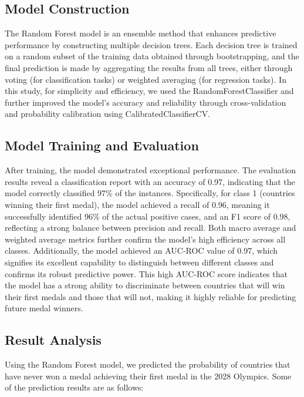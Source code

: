 \documentclass[12pt]{article}
\begin{document}
\subsection{Model Construction}

The Random Forest model is an ensemble method that enhances predictive performance by constructing multiple decision trees. Each decision tree is trained on a random subset of the training data obtained through bootstrapping, and the final prediction is made by aggregating the results from all trees, either through voting (for classification tasks) or weighted averaging (for regression tasks). In this study, for simplicity and efficiency, we used the RandomForestClassifier and further improved the model's accuracy and reliability through cross-validation and probability calibration using CalibratedClassifierCV.

\subsection{Model Training and Evaluation}

After training, the model demonstrated exceptional performance. The evaluation results reveal a classification report with an accuracy of 0.97, indicating that the model correctly classified 97\% of the instances. Specifically, for class 1 (countries winning their first medal), the model achieved a recall of 0.96, meaning it successfully identified 96\% of the actual positive cases, and an F1 score of 0.98, reflecting a strong balance between precision and recall. Both macro average and weighted average metrics further confirm the model's high efficiency across all classes. Additionally, the model achieved an AUC-ROC value of 0.97, which signifies its excellent capability to distinguish between different classes and confirms its robust predictive power. This high AUC-ROC score indicates that the model has a strong ability to discriminate between countries that will win their first medals and those that will not, making it highly reliable for predicting future medal winners.

\subsection{Result Analysis}

Using the Random Forest model, we predicted the probability of countries that have never won a medal achieving their first medal in the 2028 Olympics. Some of the prediction results are as follows:
\end{document}
